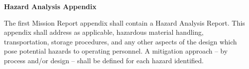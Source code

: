 \textbf{\hfill\break
}

\textbf{Hazard Analysis Appendix}

The first Mission Report appendix shall contain a Hazard Analysis
Report. This appendix shall address as applicable, hazardous material
handling, transportation, storage procedures, and any other aspects of
the design which pose potential hazards to operating personnel. A
mitigation approach -- by process and/or design -- shall be defined for
each hazard identified.
